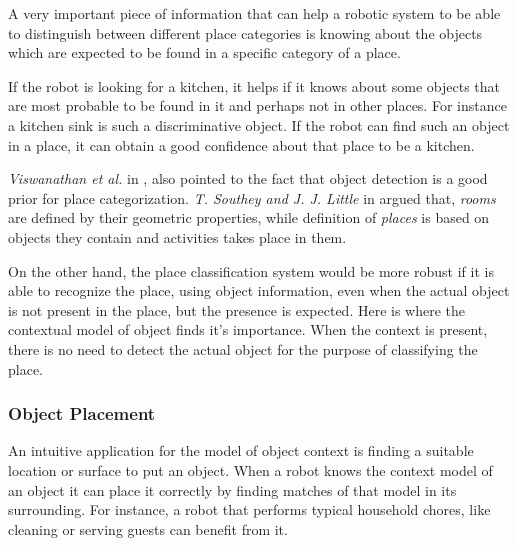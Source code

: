       A very important piece of information that can help a robotic system to be able to distinguish between different place categories 
is knowing about the objects which are expected to be found in a specific category of a place. 

If the robot is looking for a kitchen, it helps if it knows about some objects that are most probable to be found in it and 
perhaps not in other places. 
For instance a kitchen sink is such a discriminative object. 
If the robot can find such an object in a place, it can obtain a good confidence about that place to be a kitchen. 

{\it Viswanathan et al.} in \cite{P.Viswanathan}, also  pointed to the fact that object detection is a good prior for place 
categorization. {\it T. Southey and J. J. Little} in \cite{southey2006object} argued that, {\it rooms} are defined by their geometric 
properties, while definition of {\it places} is based on objects they contain and activities takes place in them.  

On the other hand, the place classification system would be more robust if it is able to recognize the place, using object information, 
even when the actual object is not present in the place, but the presence is expected.
Here is where the contextual model of object finds it's importance. When the context is present, there is no need to detect the actual 
object for the purpose of classifying the place.

 
 
 \subsubsection*{Object Placement} 
 
 An intuitive application for the model of object context is finding a suitable location or surface to put an object.
 When a robot knows the context model of an object it can place it correctly by finding matches of that model in its 
 surrounding.
 For instance, a robot that performs typical household chores, like cleaning or serving guests can benefit from it.  
 


